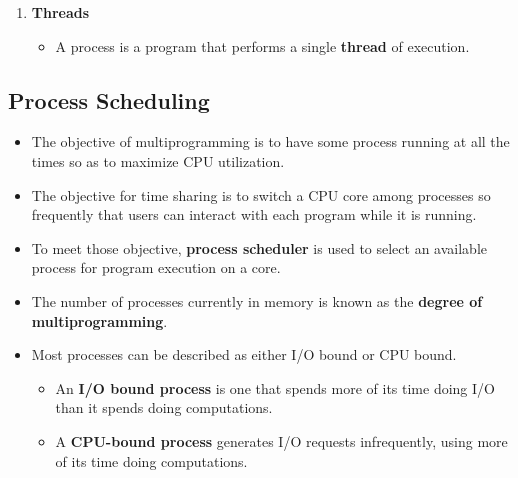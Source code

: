 \documentclass[10pt]{article}
\begin{document}
\begin{enumerate}
	\item \textbf{Threads}
	\begin{itemize}
		\item A process is a program that performs a single \textbf{thread} of execution.
	\end{itemize}
\end{enumerate}

\subsection*{Process Scheduling}

\begin{itemize}
	\item The objective of multiprogramming is to have some process running at all the times so as to maximize CPU utilization.
	\item The objective for time sharing is to switch a CPU core among processes so frequently that users can interact with each program while it is running.
	\item To meet those objective, \textbf{process scheduler} is used to select an available process for program execution on a core.
	\item The number of processes currently in memory is known as the \textbf{degree of multiprogramming}.
	\item Most processes can be described as either I/O bound or CPU bound.
	\begin{itemize}
		\item An \textbf{I/O bound process} is one that spends more of its time doing I/O than it spends doing computations.
		\item A \textbf{CPU-bound process} generates I/O requests infrequently, using more of its time doing computations. 
	\end{itemize}
\end{itemize}
\end{document}
